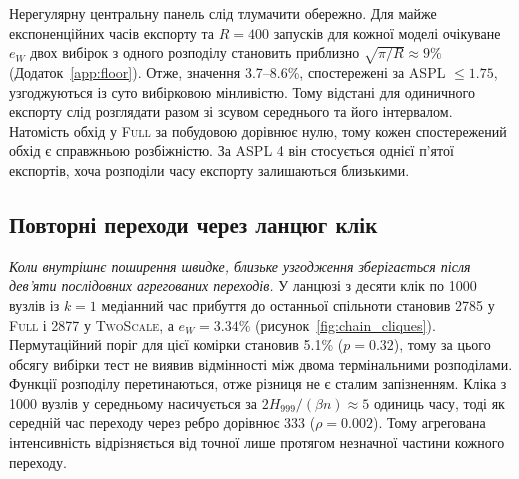 \documentclass[a4paper,fleqn]{cas-sc}
\newcommand{\Full}{\textup{\textsc{Full}}}
\newcommand{\TS}{\textup{\textsc{TwoScale}}}
\newcommand{\eW}{e_{W}}
\begin{document}
Нерегулярну центральну панель слід тлумачити обережно. Для майже експоненційних часів експорту та $R=400$ запусків для кожної моделі очікуване $\eW$ двох вибірок з одного розподілу становить приблизно $\sqrt{\pi/R}\approx9\%$ (Додаток~\ref*{app:floor}). Отже, значення 3.7--8.6\%, спостережені за ASPL $\le1.75$, узгоджуються із суто вибірковою мінливістю. Тому відстані для одиничного експорту слід розглядати разом зі зсувом середнього та його інтервалом. Натомість обхід у \Full{} за побудовою дорівнює нулю, тому кожен спостережений обхід є справжньою розбіжністю. За ASPL 4 він стосується однієї п'ятої експортів, хоча розподіли часу експорту залишаються близькими.

\subsection{Повторні переходи через ланцюг клік}
\label{sec:res_cliques}

\emph{Коли внутрішнє поширення швидке, близьке узгодження зберігається після дев'яти послідовних агрегованих переходів.} У ланцюзі з десяти клік по 1000 вузлів із $k=1$ медіанний час прибуття до останньої спільноти становив 2785 у \Full{} і 2877 у \TS{}, а $\eW=3.34\%$ (рисунок~\ref{fig:chain_cliques}). Пермутаційний поріг для цієї комірки становив 5.1\% ($p=0.32$), тому за цього обсягу вибірки тест не виявив відмінності між двома термінальними розподілами. Функції розподілу перетинаються, отже різниця не є сталим запізненням. Кліка з 1000 вузлів у середньому насичується за $2H_{999}/(\beta n)\approx5$ одиниць часу, тоді як середній час переходу через ребро дорівнює 333 ($\rho=0.002$). Тому агрегована інтенсивність відрізняється від точної лише протягом незначної частини кожного переходу.
\end{document}
